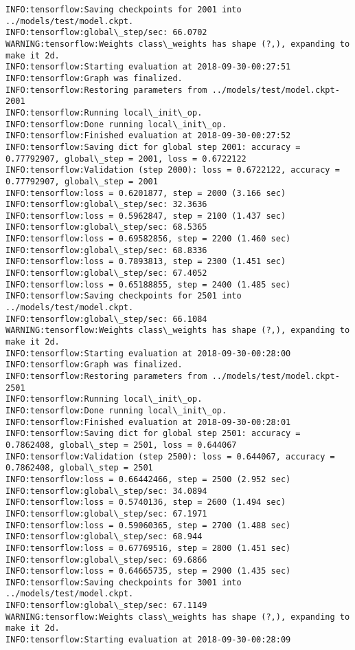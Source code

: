 \documentclass[11pt]{article}
\begin{document}
\begin{Verbatim}[commandchars=\\\{\}]
INFO:tensorflow:Saving checkpoints for 2001 into ../models/test/model.ckpt.
INFO:tensorflow:global\_step/sec: 66.0702
WARNING:tensorflow:Weights class\_weights has shape (?,), expanding to make it 2d.
INFO:tensorflow:Starting evaluation at 2018-09-30-00:27:51
INFO:tensorflow:Graph was finalized.
INFO:tensorflow:Restoring parameters from ../models/test/model.ckpt-2001
INFO:tensorflow:Running local\_init\_op.
INFO:tensorflow:Done running local\_init\_op.
INFO:tensorflow:Finished evaluation at 2018-09-30-00:27:52
INFO:tensorflow:Saving dict for global step 2001: accuracy = 0.77792907, global\_step = 2001, loss = 0.6722122
INFO:tensorflow:Validation (step 2000): loss = 0.6722122, accuracy = 0.77792907, global\_step = 2001
INFO:tensorflow:loss = 0.6201877, step = 2000 (3.166 sec)
INFO:tensorflow:global\_step/sec: 32.3636
INFO:tensorflow:loss = 0.5962847, step = 2100 (1.437 sec)
INFO:tensorflow:global\_step/sec: 68.5365
INFO:tensorflow:loss = 0.69582856, step = 2200 (1.460 sec)
INFO:tensorflow:global\_step/sec: 68.8336
INFO:tensorflow:loss = 0.7893813, step = 2300 (1.451 sec)
INFO:tensorflow:global\_step/sec: 67.4052
INFO:tensorflow:loss = 0.65188855, step = 2400 (1.485 sec)
INFO:tensorflow:Saving checkpoints for 2501 into ../models/test/model.ckpt.
INFO:tensorflow:global\_step/sec: 66.1084
WARNING:tensorflow:Weights class\_weights has shape (?,), expanding to make it 2d.
INFO:tensorflow:Starting evaluation at 2018-09-30-00:28:00
INFO:tensorflow:Graph was finalized.
INFO:tensorflow:Restoring parameters from ../models/test/model.ckpt-2501
INFO:tensorflow:Running local\_init\_op.
INFO:tensorflow:Done running local\_init\_op.
INFO:tensorflow:Finished evaluation at 2018-09-30-00:28:01
INFO:tensorflow:Saving dict for global step 2501: accuracy = 0.7862408, global\_step = 2501, loss = 0.644067
INFO:tensorflow:Validation (step 2500): loss = 0.644067, accuracy = 0.7862408, global\_step = 2501
INFO:tensorflow:loss = 0.66442466, step = 2500 (2.952 sec)
INFO:tensorflow:global\_step/sec: 34.0894
INFO:tensorflow:loss = 0.5740136, step = 2600 (1.494 sec)
INFO:tensorflow:global\_step/sec: 67.1971
INFO:tensorflow:loss = 0.59060365, step = 2700 (1.488 sec)
INFO:tensorflow:global\_step/sec: 68.944
INFO:tensorflow:loss = 0.67769516, step = 2800 (1.451 sec)
INFO:tensorflow:global\_step/sec: 69.6866
INFO:tensorflow:loss = 0.64665735, step = 2900 (1.435 sec)
INFO:tensorflow:Saving checkpoints for 3001 into ../models/test/model.ckpt.
INFO:tensorflow:global\_step/sec: 67.1149
WARNING:tensorflow:Weights class\_weights has shape (?,), expanding to make it 2d.
INFO:tensorflow:Starting evaluation at 2018-09-30-00:28:09

\end{Verbatim}
\end{document}
